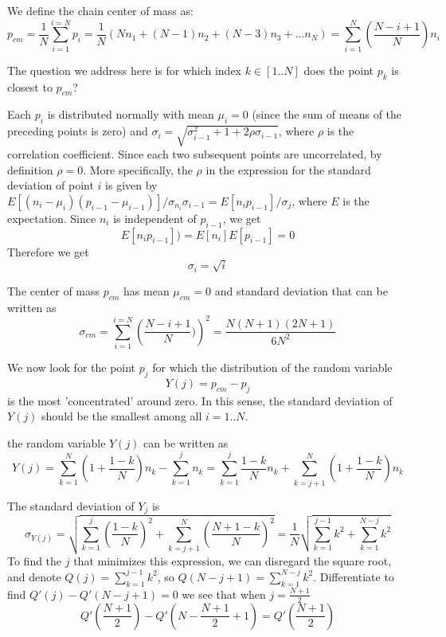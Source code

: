 \documentclass{report}
\begin{document}
We define the chain center of mass as:
\begin{equation*}
p_{cm}=\frac{1}{N}\sum_{i=1}^{i=N}p_i = \frac{1}{N}(Nn_1+(N-1)n_2+(N-3)n_3+...n_N)=\sum_{i=1}^{N}(\frac{N-i+1}{N})n_i
\end{equation*}

The question we address here is for which index $k\in[1..N]$ does the point $p_k$ is closest to $p_{cm}$?

Each $p_i$ is distributed normally with mean $\mu_i =0$ (since the sum of means of the preceding points is zero) and $\sigma_i=\sqrt{\sigma_{i-1}^2+1+2\rho\sigma_{i-1}}$, where $\rho$ is the correlation coefficient. Since each two subsequent points are uncorrelated, by definition $\rho=0$. More specifically, the $\rho$ in the expression for the standard deviation of point $i$ is given by $E[(n_i-\mu_i)(p_{i-1}-\mu_{i-1})]/\sigma_{n_i}\sigma_{i-1}=E[n_ip_{i-1}]/\sigma_j$, where $E$ is the expectation. Since $n_i$ is independent of $p_{i-1}$, we get
\begin{equation*}
E[n_ip_{i-1}])=E[n_i]E[p_{i-1}]=0
\end{equation*}
Therefore we get 
\begin{equation*}
\sigma_i=\sqrt{i}
\end{equation*}

The center of mass $p_{cm}$ has mean $\mu_{cm}=0$ and standard deviation that can be written as
\begin{equation*}
\sigma_{cm}=\sum_{i=1}^{i=N}\left( \frac{N-i+1}{N}) \right)^2 = \frac{N(N+1)(2N+1)}{6N^2}
\end{equation*}

We now look for the point $p_j$ for which the distribution of the random variable 
\begin{equation*}
Y(j)=p_{cm}-p_j
\end{equation*}
is the most 'concentrated' around zero. 
In this sense, the standard deviation of $Y(j)$ should be the smallest among all $i=1..N$.

the random variable $Y(j)$ can be written as
\begin{equation*}
Y(j) = \sum_{k=1}^{N}\left(1+\frac{1-k}{N}\right)n_k -\sum_{k=1}^{j}n_k = \sum_{k=1}^{j}\frac{1-k}{N}n_k +\sum_{k=j+1}^{N}(1+\frac{1-k}{N})n_k
\end{equation*}

The standard deviation of $Y_j$ is
\begin{equation*}
\sigma_{Y(j)}=\sqrt{\sum_{k=1}^{j}\left(\frac{1-k}{N}\right)^2+\sum_{k=j+1}^{N}\left(\frac{N+1-k}{N} \right)^2}=\frac{1}{N}\sqrt{\sum_{k=1}^{j-1}k^2+\sum_{k=1}^{N-j}k^2}
\end{equation*}
To find the $j$ that minimizes this expression, we can disregard the square root, and denote $Q(j)=\sum_{k=1}^{j-1}k^2$, so $Q(N-j+1)=\sum_{k=1}^{N-j}k^2$. Differentiate to find $Q'(j)-Q'(N-j+1)=0$  we see that when $j= \frac{N+1}{2}$\\
\begin{equation*}
Q'(\frac{N+1}{2})-Q'(N-\frac{N+1}{2}+1)=Q'(\frac{N+1}{2})
\end{equation*} 
\end{document}
